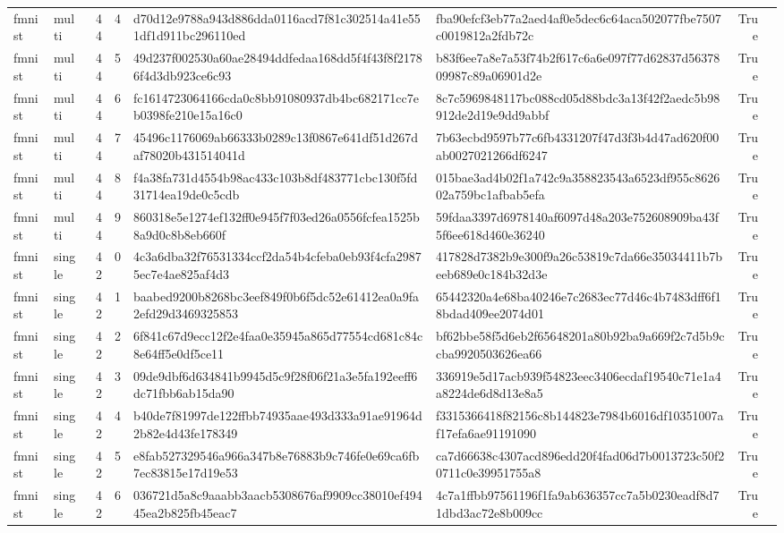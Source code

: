 \begin{tabular}{llrrllrl}
fmnist & multi & 44 & 4 & d70d12e9788a943d886dda0116acd7f81c302514a41e551df1d911bc296110ed & fba90efcf3eb77a2aed4af0e5dec6c64aca502077fbe7507c0019812a2fdb72c & True &  \\
fmnist & multi & 44 & 5 & 49d237f002530a60ae28494ddfedaa168dd5f4f43f8f21786f4d3db923ce6c93 & b83f6ee7a8e7a53f74b2f617c6a6e097f77d62837d5637809987c89a06901d2e & True &  \\
fmnist & multi & 44 & 6 & fc1614723064166cda0c8bb91080937db4bc682171cc7eb0398fe210e15a16c0 & 8c7c5969848117bc088cd05d88bdc3a13f42f2aedc5b98912de2d19e9dd9abbf & True &  \\
fmnist & multi & 44 & 7 & 45496c1176069ab66333b0289c13f0867e641df51d267daf78020b431514041d & 7b63ecbd9597b77c6fb4331207f47d3f3b4d47ad620f00ab0027021266df6247 & True &  \\
fmnist & multi & 44 & 8 & f4a38fa731d4554b98ac433c103b8df483771cbc130f5fd31714ea19de0c5cdb & 015bae3ad4b02f1a742c9a358823543a6523df955c862602a759bc1afbab5efa & True &  \\
fmnist & multi & 44 & 9 & 860318e5e1274ef132ff0e945f7f03ed26a0556fcfea1525b8a9d0c8b8eb660f & 59fdaa3397d6978140af6097d48a203e752608909ba43f5f6ee618d460e36240 & True &  \\
fmnist & single & 42 & 0 & 4c3a6dba32f76531334ccf2da54b4cfeba0eb93f4cfa29875ec7e4ae825af4d3 & 417828d7382b9e300f9a26c53819c7da66e35034411b7beeb689e0c184b32d3e & True &  \\
fmnist & single & 42 & 1 & baabed9200b8268bc3eef849f0b6f5dc52e61412ea0a9fa2efd29d3469325853 & 65442320a4e68ba40246e7c2683ec77d46c4b7483dff6f18bdad409ee2074d01 & True &  \\
fmnist & single & 42 & 2 & 6f841c67d9ecc12f2e4faa0e35945a865d77554cd681c84c8e64ff5e0df5ce11 & bf62bbe58f5d6eb2f65648201a80b92ba9a669f2c7d5b9ccba9920503626ea66 & True &  \\
fmnist & single & 42 & 3 & 09de9dbf6d634841b9945d5c9f28f06f21a3e5fa192eeff6dc71fbb6ab15da90 & 336919e5d17acb939f54823eec3406ecdaf19540c71e1a4a8224de6d8d13e8a5 & True &  \\
fmnist & single & 42 & 4 & b40de7f81997de122ffbb74935aae493d333a91ae91964d2b82e4d43fe178349 & f3315366418f82156c8b144823e7984b6016df10351007af17efa6ae91191090 & True &  \\
fmnist & single & 42 & 5 & e8fab527329546a966a347b8e76883b9c746fe0e69ca6fb7ec83815e17d19e53 & ca7d66638c4307acd896edd20f4fad06d7b0013723c50f20711c0e39951755a8 & True &  \\
fmnist & single & 42 & 6 & 036721d5a8c9aaabb3aacb5308676af9909cc38010ef49445ea2b825fb45eac7 & 4c7a1ffbb97561196f1fa9ab636357cc7a5b0230eadf8d71dbd3ac72e8b009cc & True &  \\

\end{tabular}
